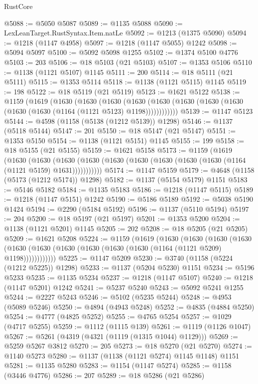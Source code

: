 \begin{lexlean}{RustCore}
\begin{coremodule}
@5088 := @5050 @5087
@5089 := @1135 @5088
@5090 := LexLeanTarget.RustSyntax.Item.natLe
@5092 := @1213 (@1375 @5090)
@5094 := @1218 (@1147 @4958)
@5097 := @1218 (@1147 @5055) @1242
@5098 := @5094 @5097
@5100 := @5092 @5098 @1255
@5102 := @1374 @5100 @4776
@5103 := 203
@5106 := @18 @5103 (@21 @5103)
@5107 := @1353 @5106
@5110 := @1138 (@1121 @5107) @1145
@5111 := 200
@5114 := @18 @5111 (@21 @5111)
@5115 := @1353 @5114
@5118 := @1138 (@1121 @5115) @1145
@5119 := 198
@5122 := @18 @5119 (@21 @5119)
@5123 := @1621 @5122
@5138 := @1159
    (@1619
      (@1630
        (@1630
          (@1630
            (@1630 (@1630 (@1630 (@1630 (@1630 (@1630 (@1630 (@1164 (@1121 @5123) @1198))))))))))))
@5139 := @1147 @5123
@5144 := @4598 (@1158 (@5138 (@1212 @5139)) @1298)
@5146 := @1137 (@5118 @5144)
@5147 := 201
@5150 := @18 @5147 (@21 @5147)
@5151 := @1353 @5150
@5154 := @1138 (@1121 @5151) @1145
@5155 := 199
@5158 := @18 @5155 (@21 @5155)
@5159 := @1621 @5158
@5173 := @1159
    (@1619
      (@1630
        (@1630
          (@1630 (@1630 (@1630 (@1630 (@1630 (@1630 (@1630 (@1164 (@1121 @5159) @1631)))))))))))
@5174 := @1147 @5159
@5179 := @4648 (@1158 (@5173 (@1212 @5174)) @1298)
@5182 := @1137 (@5154 @5179) @1151
@5183 := @5146 @5182
@5184 := @1135 @5183
@5186 := @1218 (@1147 @5115)
@5189 := @1218 (@1147 @5151) @1242
@5190 := @5186 @5189
@5192 := @5038 @5190 @1424
@5194 := @2290 (@5184 @5192)
@5196 := @1137 (@5110 @5194)
@5197 := 204
@5200 := @18 @5197 (@21 @5197)
@5201 := @1353 @5200
@5204 := @1138 (@1121 @5201) @1145
@5205 := 202
@5208 := @18 @5205 (@21 @5205)
@5209 := @1621 @5208
@5224 := @1159
    (@1619
      (@1630
        (@1630
          (@1630
            (@1630 (@1630 (@1630 (@1630 (@1630 (@1630 (@1630 (@1164 (@1121 @5209) @1198))))))))))))
@5225 := @1147 @5209
@5230 := @3740 (@1158 (@5224 (@1212 @5225)) @1298)
@5233 := @1137 (@5204 @5230) @1151
@5234 := @5196 @5233
@5235 := @1135 @5234
@5237 := @1218 (@1147 @5107)
@5240 := @1218 (@1147 @5201) @1242
@5241 := @5237 @5240
@5243 := @5092 @5241 @1255
@5244 := @2227 @5243
@5246 := @5102 (@5235 @5244)
@5248 := @4953 (@5089 @5246)
@5250 := @4894 (@4943 @5248)
@5252 := @4835 (@4884 @5250)
@5254 := @4777 (@4825 @5252)
@5255 := @4765 @5254
@5257 := @1029 (@4717 @5255)
@5259 := @1112 (@1115 @139)
@5261 := @1119 (@1126 @1047)
@5267 := @5261 (@4319 (@4321 (@1119 (@1315 @1044) @1129)))
@5269 := @5259 @5267 @3812
@5270 := 205
@5273 := @18 @5270 (@21 @5270)
@5274 := @1140 @5273
@5280 := @1137 (@1138 (@1121 @5274) @1145 @1148) @1151
@5281 := @1135 @5280
@5283 := @1154 (@1147 @5274)
@5285 := @1158 (@3446 @4776)
@5286 := 207
@5289 := @18 @5286 (@21 @5286)

\end{coremodule}
\end{lexlean}
